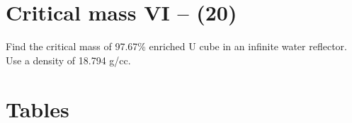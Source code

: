 \documentclass[11pt,a4paper]{article}
\makeatletter
\renewcommand\listoftables{%
    \@starttoc{lot}%
}
\makeatother
\begin{document}
\newpage

\section{Critical mass VI -- (20)}
Find the critical mass of 97.67\% enriched U cube in an infinite water reflector. Use a density of 18.794 g/cc.





\pagestyle{fancyplain}
\fancyhf{} %
\renewcommand{\headrulewidth}{0pt} %
\rfoot{\fancyplain{}{\thepage}}
\nolinenumbers


%
%

\setlength{\bibhang}{0pt}

%


\newpage


\section*{Tables}

{%
\let\oldnumberline\numberline%
\renewcommand{\numberline}{\tablename~\oldnumberline}%
\listoftables%
}


\newpage
\end{document}
